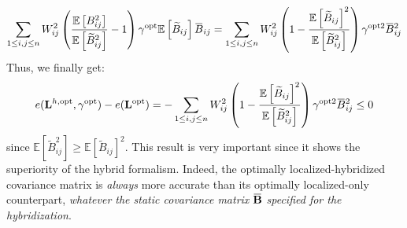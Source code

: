 \documentclass[12pt]{scrartcl}
\newcommand{\overbar}[1]{\mkern 1.5mu\overline{\mkern-1.5mu#1\mkern-1.5mu}\mkern 1.5mu}
\begin{document}
\begin{align}
\sum_{1 \le i,j \le n} W_{ij}^2 \left(\frac{\mathbb{E} \left[B^2_{ij}\right]}{\mathbb{E} \left[\widetilde{B}_{ij}^2\right]}  - 1  \right) \gamma^\mathrm{opt} \mathbb{E} \left[\widetilde{B}_{ij}\right] \overbar{B}_{ij} =  \sum_{1 \le i,j \le n} W_{ij}^2 \left(1 - \frac{\mathbb{E} \left[\widetilde{B}_{ij}\right]^2}{\mathbb{E}\left[ \widetilde{B}_{ij}^2 \right]}\right) \gamma^{\mathrm{opt}2} \overbar{B}_{ij}^2
\end{align}
Thus, we finally get:
\begin{align}
\label{eq:hyb_better}
e(\mathbf{L}^{h,\mathrm{opt}},\gamma^\mathrm{opt}) - e(\mathbf{L}^\mathrm{opt}) = - \sum_{1 \le i,j \le n} W_{ij}^2 \left(1 - \frac{\mathbb{E} \left[\widetilde{B}_{ij}\right]^2}{\mathbb{E}\left[ \widetilde{B}_{ij}^2 \right]}\right) \gamma^{\mathrm{opt}2} \overbar{B}_{ij}^2 \le 0
\end{align}
since $\mathbb{E}\left[ \widetilde{B}_{ij}^2 \right] \ge \mathbb{E} \left[\widetilde{B}_{ij}\right]^2$. This result is very important since it shows the superiority of the hybrid formalism. Indeed, the optimally localized-hybridized covariance matrix is \textit{always} more accurate than its optimally localized-only counterpart, \textit{whatever the static covariance matrix} $\overbar{\mathbf{B}}$ \textit{specified for the hybridization}. 
\end{document}
